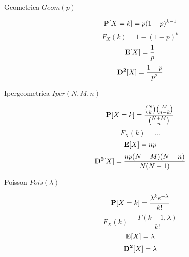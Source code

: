 \begin{description}
	\item[Geometrica $Geom(p)$]
		\begin{equation}
		\mathbf{P}[X=k]=p(1-p)^{k-1}
		\end{equation}
		\begin{equation}
		F_{X}(k)=1-(1-p)^{k}
		\end{equation}
		\begin{equation}
		\mathbf{E}[X]=\frac{1}{p}
		\end{equation}
		\begin{equation}
		\mathbf{D^{2}}[X]=\frac{1-p}{p^{2}}
		\end{equation}
		
	\item[Ipergeometrica $Iper(N,M,n)$]
		\begin{equation}
		\mathbf{P}[X=k]=\frac{\binom{N}{k}\binom{M}{n-k}}{\binom{N+M}{n}}
		\end{equation}
		\begin{equation}
		F_{X}(k)=\dots
		\end{equation}
		\begin{equation}
		\mathbf{E}[X]=np
		\end{equation}
		\begin{equation}
		\mathbf{D^{2}}[X]=\frac{np(N-M)(N-n)}{N(N-1)}
		\end{equation}
	
	\item[Poisson $Pois(\lambda)$]
		\begin{equation}
		\mathbf{P}[X=k]=\frac{\lambda^{k}e^{-\lambda}}{k!}
		\end{equation}
		\begin{equation}
		F_{X}(k)=\frac{\Gamma(k+1,\lambda)}{k!}
		\end{equation}
		\begin{equation}
		\mathbf{E}[X]=\lambda
		\end{equation}
		\begin{equation}
		\mathbf{D^{2}}[X]=\lambda
		\end{equation}
	
\end{description}
\newpage

